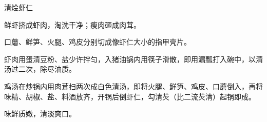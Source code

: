 %
%
%
%
%
%
%
\begin{recipe}{清烩虾仁}

\ingredients


\preparation

\step 鲜虾挤成虾肉，淘洗干净；瘦肉砸成肉茸。

\step 口蘑、鲜笋、火腿、鸡皮分别切成像虾仁大小的指甲壳片。

\step 虾肉用蛋清豆粉、盐少许拌匀，入猪油锅内用筷子滑散，即用漏瓢打入碗中，以清
汤过二次，除尽油质。

\step 鸡汤在炒锅内用肉茸扫两次成白色清汤，即将火腿、鲜笋、鸡皮、口蘑倒入，再将
味精、胡椒、盐、料酒放齐，开锅后倒虾仁，勾清芡（比二流芡清）起锅即成。

\features

味鲜质嫩，清淡爽口。

\end{recipe}

